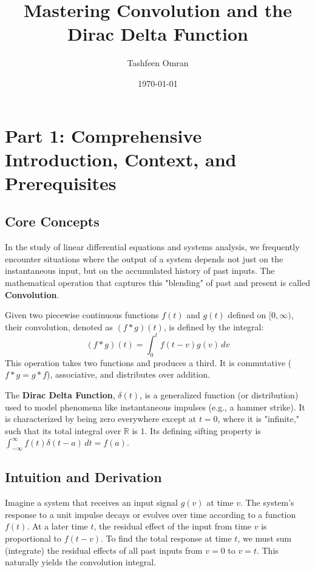 \documentclass[11pt, letterpaper]{article}
\theoremstyle{definition}
\theoremstyle{remark}
\newcommand{\R}{\mathbb{R}}
\begin{document}
\title{\textbf{Mastering Convolution and the Dirac Delta Function}}
\author{Tashfeen Omran}
\date{\today}
\maketitle

\tableofcontents
\newpage

\section{Part 1: Comprehensive Introduction, Context, and Prerequisites}

\subsection{Core Concepts}
In the study of linear differential equations and systems analysis, we frequently encounter situations where the output of a system depends not just on the instantaneous input, but on the accumulated history of past inputs. The mathematical operation that captures this "blending" of past and present is called \textbf{Convolution}. 

Given two piecewise continuous functions $f(t)$ and $g(t)$ defined on $[0, \infty)$, their convolution, denoted as $(f * g)(t)$, is defined by the integral:
\[
(f * g)(t) = \int_0^t f(t - v)g(v) \, dv
\]
This operation takes two functions and produces a third. It is commutative ($f * g = g * f$), associative, and distributes over addition. 

The \textbf{Dirac Delta Function}, $\delta(t)$, is a generalized function (or distribution) used to model phenomena like instantaneous impulses (e.g., a hammer strike). It is characterized by being zero everywhere except at $t=0$, where it is "infinite," such that its total integral over $\R$ is $1$. Its defining sifting property is $\int_{-\infty}^{\infty} f(t)\delta(t-a) \, dt = f(a)$.

\subsection{Intuition and Derivation}
Imagine a system that receives an input signal $g(v)$ at time $v$. The system's response to a unit impulse decays or evolves over time according to a function $f(t)$. At a later time $t$, the residual effect of the input from time $v$ is proportional to $f(t-v)$. To find the total response at time $t$, we must sum (integrate) the residual effects of all past inputs from $v=0$ to $v=t$. This naturally yields the convolution integral.
\end{document}
